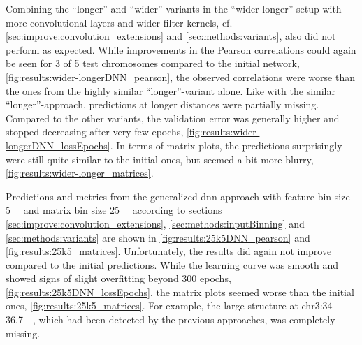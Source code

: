 Combining the ``longer'' and ``wider'' variants in the ``wider-longer'' setup with more convolutional layers and wider 
filter kernels,  cf. \cref{sec:improve:convolution_extensions} and \ref{sec:methods:variants}, also did not perform as expected.
While improvements in the Pearson correlations could again be seen for 3 of 5 test chromosomes compared to the initial network, \cref{fig:results:wider-longerDNN_pearson},
the observed correlations were worse than the ones from the highly similar ``longer''-variant alone. 
Like with the similar ``longer''-approach, predictions at longer distances were partially missing. 
Compared to the other variants, the validation error was generally higher and stopped decreasing after very few epochs, \cref{fig:results:wider-longerDNN_lossEpochs}.
In terms of matrix plots, the predictions surprisingly were still quite similar to the initial ones, but seemed a bit more blurry, \cref{fig:results:wider-longer_matrices}.

Predictions and metrics from the generalized \acrshort{dnn}-approach with feature bin size \SI{5}{\kilo\bp} and matrix bin size \SI{25}{\kilo\bp}
according to sections \ref{sec:improve:convolution_extensions}, \ref{sec:methods:inputBinning} and \ref{sec:methods:variants} 
are shown in \cref{fig:results:25k5DNN_pearson} and \ref{fig:results:25k5_matrices}.
Unfortunately, the results did again not improve compared to the initial predictions.
While the learning curve was smooth and showed signs of slight overfitting beyond 300 epochs, \cref{fig:results:25k5DNN_lossEpochs},
the matrix plots seemed worse than the initial ones, \cref{fig:results:25k5_matrices}. 
For example, the large structure at chr3:34-\SI{36.7}{\mega\bp}, which had been detected by the previous approaches, was completely missing.

